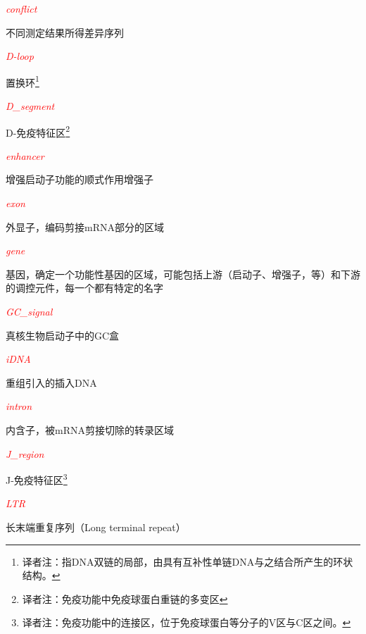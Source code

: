 \textcolor{red}{\textit{conflict}}
\begin{adjustwidth}{4em}{}
不同测定结果所得差异序列
\end{adjustwidth}

\textcolor{red}{\textit{D-loop}}
\begin{adjustwidth}{4em}{}
置换环\footnote{译者注：指DNA双链的局部，由具有互补性单链DNA与之结合所产生的环状结构。}
\end{adjustwidth}

\textcolor{red}{\textit{D\_segment}}
\begin{adjustwidth}{4em}{}
D-免疫特征区\footnote{译者注：免疫功能中免疫球蛋白重链的多变区}
\end{adjustwidth}

\textcolor{red}{\textit{enhancer}}
\begin{adjustwidth}{4em}{}
增强启动子功能的顺式作用增强子
\end{adjustwidth}

\textcolor{red}{\textit{exon}}
\begin{adjustwidth}{4em}{}
外显子，编码剪接mRNA部分的区域
\end{adjustwidth}

\textcolor{red}{\textit{gene}}
\begin{adjustwidth}{4em}{}
基因，确定一个功能性基因的区域，可能包括上游（启动子、增强子，等）和下游的调控元件，每一个都有特定的名字
\end{adjustwidth}

\textcolor{red}{\textit{GC\_signal}}
\begin{adjustwidth}{4em}{}
真核生物启动子中的GC盒
\end{adjustwidth}

\textcolor{red}{\textit{iDNA}}
\begin{adjustwidth}{4em}{}
重组引入的插入DNA
\end{adjustwidth}

\textcolor{red}{\textit{intron}}
\begin{adjustwidth}{4em}{}
内含子，被mRNA剪接切除的转录区域
\end{adjustwidth}

\textcolor{red}{\textit{J\_region}}
\begin{adjustwidth}{4em}{}
J-免疫特征区\footnote{译者注：免疫功能中的连接区，位于免疫球蛋白等分子的V区与C区之间。}
\end{adjustwidth}

\textcolor{red}{\textit{LTR}}
\begin{adjustwidth}{4em}{}
长末端重复序列（Long terminal repeat）
\end{adjustwidth}

